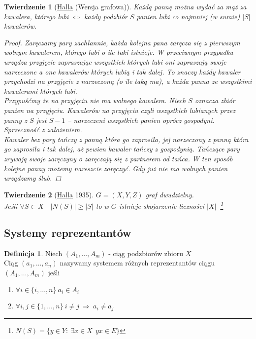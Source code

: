 \documentclass[12pt,a4paper]{article}
\newtheorem{tw}{Twierdzenie}
\theoremstyle{definition}
\newtheorem{df}{Definicja}
\begin{document}
\begin{tw}[\href{http://pl.wikipedia.org/wiki/Philip_Hall}{Halla} (Wersja grafowa)]\label{tw:halla}
Każdą pannę można wydać za mąż za kawalera, którego lubi $\Leftrightarrow$ każdy podzbiór $S$ panien lubi co najmniej (w sumie) $|S|$ kawalerów.
\begin{proof}
Zaręczamy pary zachłannie, każda kolejna pana zaręcza się z pierwszym wolnym kawalerem, którego lubi o ile taki istnieje. W przeciwnym przypadku urządza przyjęcie zapraszając wszystkich których lubi oni zapraszają swoje narzeczone a one kawalerów których lubią i tak dalej. To znaczy każdy kawaler przychodzi na przyjęcie z narzeczoną (o ile taką ma), a każda panna ze wszystkimi kawalerami których lubi.\\
Przypuśćmy że na przyjęciu nie ma wolnego kawalera. Niech $S$ oznacza zbiór panien na przyjęciu. Kawalerów na przyjęciu czyli wszystkich lubianych przez panny z $S$ jest $S-1$ -- narzeczeni wszystkich panien oprócz gospodyni. Sprzeczność z założeniem.\\
Kawaler bez pary tańczy z panną która go zaprosiła, jej narzeczony z panną która go zaprosiła i tak dalej, aż pewien kawaler tańczy z gospodynią. Tańczące pary zrywają swoje zaręczyny o zaręczają się z partnerem od tańca. W ten sposób kolejne panny możemy nareszcie zaręczyć. Gdy już nie ma wolnych panien urządzamy ślub. 
\end{proof}
\end{tw}

\begin{tw}[\href{http://pl.wikipedia.org/wiki/Philip_Hall}{Halla} 1935]
$G=(X,Y,Z)$ graf dwudzielny. \\Jeśli $\forall S\subset X\quad |N(S)| \geqslant |S|$ to w $G$ istnieje skojarzenie liczności $|X|~$ \footnote{$N(S) = \{y\in Y: ~ \exists x\in X ~~ yx \in E\}$}
\end{tw}

\subsection{Systemy reprezentantów}
\begin{df}
Niech $(A_1, \dots , A_m)$ - ciąg podzbiorów zbioru $X$\\
Ciąg $(a_1, \dots , a_n)$ nazywamy systemem różnych reprezentantów ciągu $(A_1,\dots, A_m)$ jeśli 
\begin{enumerate}
	\item $\forall i\in\{i,\dots , n\} ~ a_i \in A_i$
	\item $\forall i,j\in\{1, \dots ,n\} ~ i\neq j ~\Rightarrow ~a_i \neq a_j$
\end{enumerate}
\end{df}
\end{document}
